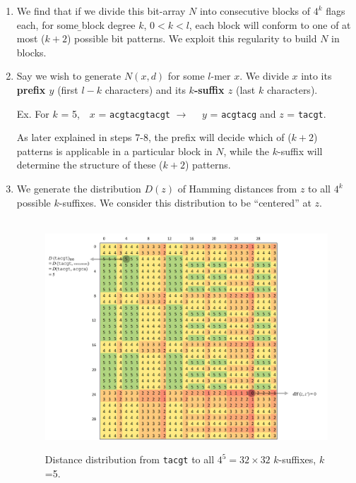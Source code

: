 \documentclass[oneside,12pt]{DISCSthesis}
\begin{document}
{\begin{enumerate}
			\item We find that if we divide this bit-array $N$ into consecutive blocks of $4^{k}$ flags each, for some {\b\boldmath block degree $k$}, $0 < k < l$, each block will conform to one of at most ($k + 2$) possible bit patterns. We exploit this regularity to build $N$ in blocks.

			\item Say we wish to generate $N(x,d)$ for some $l$-mer $x$. We divide $x$ into its {\bf\boldmath prefix $y$ }(first $l - k$ characters) and its {\bf\boldmath $k$-suffix $z$} (last $k$ characters).

				{\small\hspace*{40pt}Ex. For $k$ = 5,\ \ $x$ = \texttt{acgtacgtacgt} $\rightarrow$ \ \ $y$ = \texttt{acgtacg} and $z$ = \texttt{tacgt}.}

			As later explained in steps 7-8, the prefix will decide which of ($k + 2$) patterns is applicable in a particular block in $N$, while the $k$-suffix will determine the structure of these ($k + 2$) patterns.

			\item We generate the distribution $D(z)$ of Hamming distances from $z$ to all $4^{k}$ possible $k$-suffixes. We consider this distribution to be ``centered'' at $z$.

				\begin{figure}[h] \label{fig:D_tacgt}
					\
					\includegraphics[width=6.0in]{img/D(tacgt)_marked_2}
					\caption{Distance distribution from \texttt{tacgt} to all $4^{5} = 32 \times 32$ $k$-suffixes, $k$=5.}
					\end{figure}


\end{enumerate}}
\end{document}
